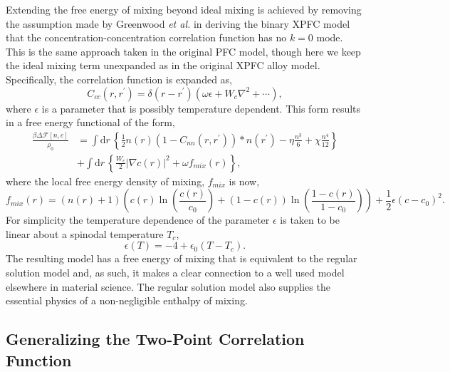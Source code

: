 \documentclass[showkeys, prb, reprint]{revtex4-1}
\renewcommand{\d}{\delta}       %
\newcommand{\F}{\mathcal{F}}    %
\renewcommand{\l}{\left}        %
\renewcommand{\r}{\right}       %
\newcommand{\f}{\frac}          %
\newcommand{\integrate}[1]{\int \mathrm{d}#1\,}
\begin{document}
Extending the free energy of mixing beyond ideal mixing is achieved by removing
the assumption made by Greenwood \textit{et al.} in deriving the binary XPFC
model that the concentration-concentration correlation function has no $k=0$
mode. This is the same approach taken in the original PFC model, though here we
keep the ideal mixing term unexpanded as in the original XPFC alloy model.
Specifically, the correlation function is expanded as,
%
\begin{equation}
    C_{cc}(r, r^\prime) = \d(r - r^\prime)
        \l(\omega\epsilon + W_c\nabla^2 + \cdots\r),
\end{equation}
%
where $\epsilon$ is a parameter that is possibly temperature dependent. This
form results in a free energy functional of the form,
%
\begin{align}
    \f{\beta\Delta\F[n, c]}{\rho_0} &= \integrate{r} \l\lbrace
        \f{1}{2} n(r) \l(1 - C_{nn}(r, r^\prime)\r) \ast n(r^\prime)
        - \eta \f{n^3}{6} + \chi \f{n^4}{12} \r\rbrace \\
        &+ \integrate{r}\l\lbrace
            \f{W_c}{2}\l\vert \nabla c(r) \r\vert^2 + \omega f_{mix}(r)
            \r\rbrace, \nonumber
\end{align}
%
where the local free energy density of mixing, $f_{mix}$ is now,
%
\begin{equation}
    f_{mix}(r) = \l(n(r) + 1\r)\l(
            c(r)\ln\l(\f{c(r)}{c_0}\r)
          + (1-c(r))\ln\l(\f{1-c(r)}{1-c_0}\r) \r)
          + \f{1}{2} \epsilon (c - c_0)^2.
\end{equation}
%
For simplicity the temperature dependence of the parameter $\epsilon$ is taken
to be linear about a spinodal temperature $T_c$,
%
\begin{equation}
    \label{eq:spinodal_model}
    \epsilon(T) = -4 + \epsilon_0(T - T_c).
\end{equation}
%
The resulting model has a free energy of mixing that is equivalent to the
regular solution model and, as such, it makes a clear connection to a well used
model elsewhere in material science. The regular solution model also supplies
the essential physics of a non-negligible enthalpy of mixing. 

\subsection{Generalizing the Two-Point Correlation Function} %
\end{document}
